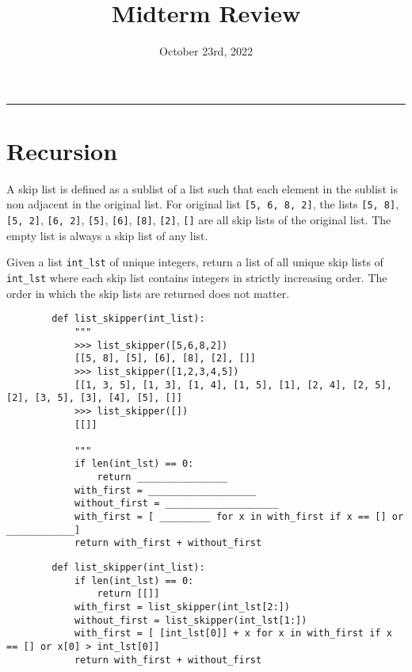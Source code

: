 \documentclass{exam}
\title{Midterm Review}
\date{October 23rd, 2022}
\begin{document}
\maketitle
\rule{\textwidth}{0.15em}
\fontsize{12}{15}\selectfont


\section{Recursion}
    \begin{blocksection}
        A skip list is defined as a sublist of a list such that each element in the sublist is non adjacent in the
        original list. For original list \lstinline{[5, 6, 8, 2]}, the lists \lstinline{[5, 8]}, \lstinline{[5, 2]}, \lstinline{[6, 2]}, \lstinline{[5]}, \lstinline{[6]}, \lstinline{[8]}, \lstinline{[2]}, \lstinline{[]} are
        all skip lists of the original list. The empty list is always a skip list of any list.

        Given a list \lstinline{int_lst} of unique integers, return a list of all unique skip lists of \lstinline{int_lst} where each skip
        list contains integers in strictly increasing order. The order in which the skip lists are returned does not matter.
        
        \begin{lstlisting}
        def list_skipper(int_list):
            """
            >>> list_skipper([5,6,8,2])
            [[5, 8], [5], [6], [8], [2], []]
            >>> list_skipper([1,2,3,4,5])
            [[1, 3, 5], [1, 3], [1, 4], [1, 5], [1], [2, 4], [2, 5], [2], [3, 5], [3], [4], [5], []]
            >>> list_skipper([])
            [[]]

            """
            if len(int_lst) == 0:
                return ________________
            with_first = ___________________
            without_first = ____________________
            with_first = [ _________ for x in with_first if x == [] or ____________]
            return with_first + without_first
        \end{lstlisting}
    \end{blocksection}
    \begin{solution}
        \begin{lstlisting}
        def list_skipper(int_list):
            if len(int_lst) == 0:
                return [[]]
            with_first = list_skipper(int_lst[2:])
            without_first = list_skipper(int_lst[1:])
            with_first = [ [int_lst[0]] + x for x in with_first if x == [] or x[0] > int_lst[0]]
            return with_first + without_first
        \end{lstlisting}
    \end{solution}
\end{document}
